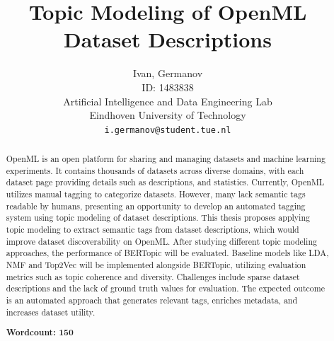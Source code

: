 \documentclass{article}
\title{Topic Modeling of OpenML Dataset Descriptions}
\author{
 Ivan, Germanov \\
 ID: 1483838 \\
 Artificial Intelligence and Data Engineering Lab\\
Eindhoven University of Technology\\
  \texttt{i.germanov@student.tue.nl} \\
}
\begin{document}
\maketitle
\begin{abstract}

    OpenML is an open platform for sharing and managing datasets and machine learning experiments. It contains thousands of datasets across diverse domains, with each dataset page providing details such as descriptions, and statistics. Currently, OpenML utilizes manual tagging to categorize datasets. However, many lack semantic tags readable by humans, presenting an opportunity to develop an automated tagging system using topic modeling of dataset descriptions. This thesis proposes applying topic modeling to extract semantic tags from dataset descriptions, which would improve dataset discoverability on OpenML. After studying different topic modeling approaches, the performance of BERTopic will be evaluated. Baseline models like LDA, NMF and Top2Vec will be implemented alongside BERTopic, utilizing evaluation metrics such as topic coherence and diversity. Challenges include sparse dataset descriptions and the lack of ground truth values for evaluation. The expected outcome is an automated approach that generates relevant tags, enriches metadata, and increases dataset utility.

    \noindent\textbf{Wordcount: 150}
\end{abstract}
\end{document}
